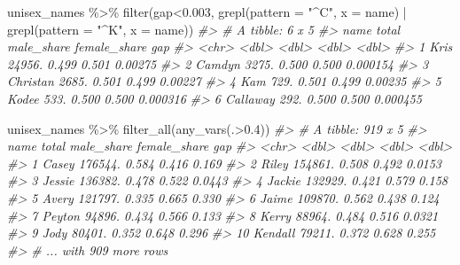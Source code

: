 \documentclass[
]{book}
\newenvironment{Shaded}{\begin{snugshade}}{\end{snugshade}}
\newcommand{\AttributeTok}[1]{\textcolor[rgb]{0.77,0.63,0.00}{#1}}
\newcommand{\CommentTok}[1]{\textcolor[rgb]{0.56,0.35,0.01}{\textit{#1}}}
\newcommand{\FloatTok}[1]{\textcolor[rgb]{0.00,0.00,0.81}{#1}}
\newcommand{\FunctionTok}[1]{\textcolor[rgb]{0.00,0.00,0.00}{#1}}
\newcommand{\NormalTok}[1]{#1}
\newcommand{\SpecialCharTok}[1]{\textcolor[rgb]{0.00,0.00,0.00}{#1}}
\newcommand{\StringTok}[1]{\textcolor[rgb]{0.31,0.60,0.02}{#1}}
\begin{document}
\begin{Shaded}
\begin{Highlighting}[]
\NormalTok{unisex\_names }\SpecialCharTok{\%\textgreater{}\%} \FunctionTok{filter}\NormalTok{(gap}\SpecialCharTok{\textless{}}\FloatTok{0.003}\NormalTok{, }\FunctionTok{grepl}\NormalTok{(}\AttributeTok{pattern =} \StringTok{"\^{}C"}\NormalTok{, }\AttributeTok{x =}\NormalTok{ name) }\SpecialCharTok{|} \FunctionTok{grepl}\NormalTok{(}\AttributeTok{pattern =} \StringTok{"\^{}K"}\NormalTok{, }\AttributeTok{x =}\NormalTok{ name))}
\CommentTok{\#\textgreater{} \# A tibble: 6 x 5}
\CommentTok{\#\textgreater{}   name      total male\_share female\_share      gap}
\CommentTok{\#\textgreater{}   \textless{}chr\textgreater{}     \textless{}dbl\textgreater{}      \textless{}dbl\textgreater{}        \textless{}dbl\textgreater{}    \textless{}dbl\textgreater{}}
\CommentTok{\#\textgreater{} 1 Kris     24956.      0.499        0.501 0.00275 }
\CommentTok{\#\textgreater{} 2 Camdyn    3275.      0.500        0.500 0.000154}
\CommentTok{\#\textgreater{} 3 Christan  2685.      0.501        0.499 0.00227 }
\CommentTok{\#\textgreater{} 4 Kam        729.      0.501        0.499 0.00235 }
\CommentTok{\#\textgreater{} 5 Kodee      533.      0.500        0.500 0.000316}
\CommentTok{\#\textgreater{} 6 Callaway   292.      0.500        0.500 0.000455}
\end{Highlighting}
\end{Shaded}

\begin{Shaded}
\begin{Highlighting}[]
\NormalTok{unisex\_names }\SpecialCharTok{\%\textgreater{}\%} \FunctionTok{filter\_all}\NormalTok{(}\FunctionTok{any\_vars}\NormalTok{(.}\SpecialCharTok{\textgreater{}}\FloatTok{0.4}\NormalTok{))}
\CommentTok{\#\textgreater{} \# A tibble: 919 x 5}
\CommentTok{\#\textgreater{}    name      total male\_share female\_share    gap}
\CommentTok{\#\textgreater{}    \textless{}chr\textgreater{}     \textless{}dbl\textgreater{}      \textless{}dbl\textgreater{}        \textless{}dbl\textgreater{}  \textless{}dbl\textgreater{}}
\CommentTok{\#\textgreater{}  1 Casey   176544.      0.584        0.416 0.169 }
\CommentTok{\#\textgreater{}  2 Riley   154861.      0.508        0.492 0.0153}
\CommentTok{\#\textgreater{}  3 Jessie  136382.      0.478        0.522 0.0443}
\CommentTok{\#\textgreater{}  4 Jackie  132929.      0.421        0.579 0.158 }
\CommentTok{\#\textgreater{}  5 Avery   121797.      0.335        0.665 0.330 }
\CommentTok{\#\textgreater{}  6 Jaime   109870.      0.562        0.438 0.124 }
\CommentTok{\#\textgreater{}  7 Peyton   94896.      0.434        0.566 0.133 }
\CommentTok{\#\textgreater{}  8 Kerry    88964.      0.484        0.516 0.0321}
\CommentTok{\#\textgreater{}  9 Jody     80401.      0.352        0.648 0.296 }
\CommentTok{\#\textgreater{} 10 Kendall  79211.      0.372        0.628 0.255 }
\CommentTok{\#\textgreater{} \# ... with 909 more rows}
\end{Highlighting}
\end{Shaded}
\end{document}
